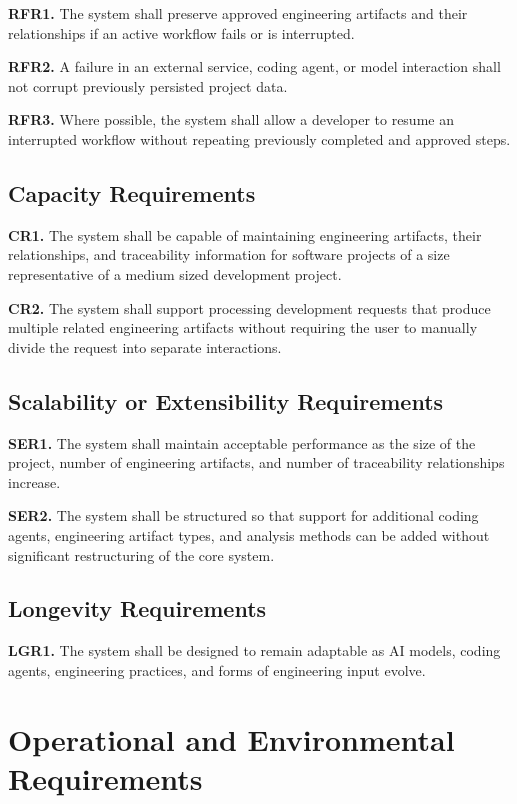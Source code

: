 \documentclass[12pt]{article}
\begin{document}
\noindent\textbf{RFR1.} The system shall preserve approved engineering artifacts and their relationships if an active workflow fails or is interrupted.

\noindent\textbf{RFR2.} A failure in an external service, coding agent, or model interaction shall not corrupt previously persisted project data.

\noindent\textbf{RFR3.} Where possible, the system shall allow a developer to resume an interrupted workflow without repeating previously completed and approved steps.

\subsection{Capacity Requirements}

\noindent\textbf{CR1.} The system shall be capable of maintaining engineering artifacts, their relationships, and traceability information for software projects of a size representative of a medium sized development project.

\noindent\textbf{CR2.} The system shall support processing development requests that produce multiple related engineering artifacts without requiring the user to manually divide the request into separate interactions.

\subsection{Scalability or Extensibility Requirements}

\noindent\textbf{SER1.} The system shall maintain acceptable performance as the size of the project, number of engineering artifacts, and number of traceability relationships increase.

\noindent\textbf{SER2.} The system shall be structured so that support for additional coding agents, engineering artifact types, and analysis methods can be added without significant restructuring of the core system.

\subsection{Longevity Requirements}

\noindent\textbf{LGR1.} The system shall be designed to remain adaptable as AI models, coding agents, engineering practices, and forms of engineering input evolve.

\section{Operational and Environmental Requirements}
\end{document}
